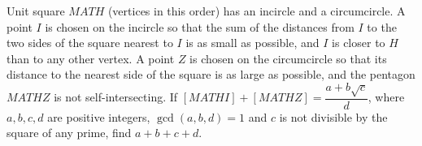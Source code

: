 Unit square $MATH$ (vertices in this order) has an incircle and a circumcircle. A point $I$ is chosen on the incircle so that the sum of the distances from $I$ to the two sides of the square nearest to $I$ is as small as possible, and $I$ is closer to $H$ than to any other vertex. A point $Z$ is chosen on the circumcircle so that its distance to the nearest side of the square is as large as possible, and the pentagon $MATHZ$ is not self-intersecting. If $[MATHI]+[MATHZ]=\dfrac{a+b\sqrt c}{d}$, where $a,b,c,d$ are positive integers, $\gcd(a,b,d)=1$ and $c$ is not divisible by the square of any prime, find $a+b+c+d$.

